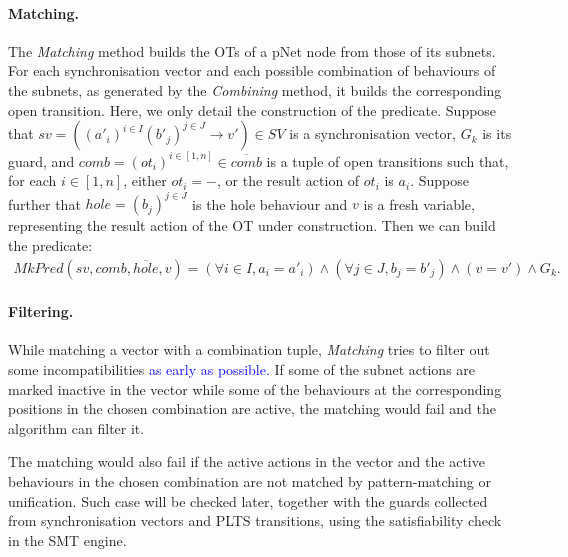 \documentclass[smallcondensed]{svjour3}
\newcommand{\ERIC}[1]{\textcolor{blue}{#1}}
\newcommand{\QIN}[1]{\textcolor{airforceblue}{#1}}
\begin{document}



\paragraph{Matching.}
The \emph{Matching} method builds the OTs of a pNet node from those of
its subnets.
For each synchronisation vector and each possible
combination of behaviours of the subnets, as generated by the \emph
{Combining} method, it builds the corresponding open transition.
Here, we only detail the construction of the predicate.
Suppose that $sv = \left((a'_i)^{i\in I} (b'_j)^{j\in J}\rightarrow v'\right) \in SV$ is a synchronisation vector, $G_k$ is its guard, and
$comb = ({ot}_i)^{i \in [1,n]} \in \overline{comb}$ is a tuple of open transitions such that, for each $i \in [1,n]$, either $ot_i = -$, or the result action of $ot_i$ is $a_i$. Suppose further that $\mathit{hole} = (b_j)^{j \in J}$ is the hole behaviour and $v$ is a fresh variable, representing the result action of the OT under construction. Then we can  build the predicate:
%
\begin{multline*}
  \mathit{MkPred}(sv, comb, \overline{\mathit{hole}}, v) = 
  (\forall i\in I, a_i=a'_i) \land
  (\forall j\in J, b_j=b'_j) \land
  (v=v') \land G_k.
\end{multline*}


\paragraph{Filtering.}
While matching a vector with a combination tuple, \emph{Matching}
tries to filter out some incompatibilities \ERIC{as early as possible.} \QIN{If some of the subnet actions are marked inactive in the vector while some of the behaviours at the corresponding positions in the chosen combination are active, the matching would fail and the algorithm can filter it.}

\QIN{The matching would also fail if the active actions in the vector and the active behaviours in the chosen combination are not matched by pattern-matching or unification. Such case will be checked later, together with the guards collected from synchronisation vectors and PLTS transitions, using the satisfiability check in the SMT engine.}
\end{document}
